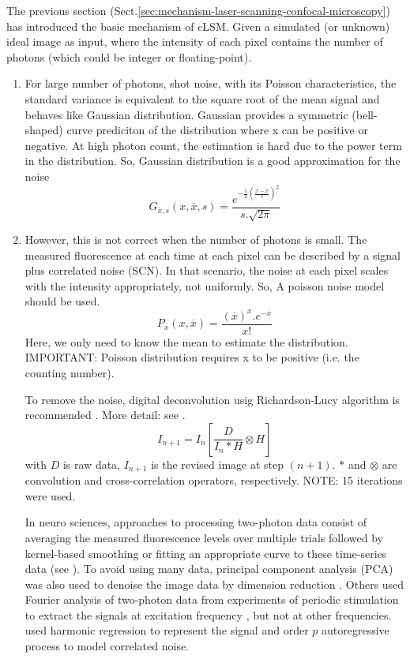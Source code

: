 The previous section (Sect.\ref{sec:mechanism-laser-scanning-confocal-microscopy}) has introduced the basic
mechanism of cLSM.  Given a simulated (or unknown) ideal image as input, where
the intensity of each pixel contains the number of photons (which could be
integer or floating-point).
\begin{enumerate}
  \item  For large number of photons, shot noise, with its Poisson
  characteristics, the standard variance is equivalent to the square root of the
  mean signal and behaves like Gaussian distribution.  Gaussian provides a
  symmetric (bell-shaped) curve prediciton of the distribution where x can be
  positive or negative. At high photon count, the estimation is  hard due to the
  power term in the distribution. So, Gaussian distribution is a  good
  approximation for the noise 
\begin{equation}
G_{\overline{x},s}(x,\overline{x},s) =
\frac{e^{-\frac{1}{2}(\frac{x-\overline{x}}{s})^2}}{s.\sqrt{2\pi}}
\end{equation}
 
  \item However, this is not correct when the number of photons is small.
  The measured fluorescence at each time at each pixel can be described by a
  signal plus correlated noise (SCN). In that scenario, the noise at each pixel
  scales with the intensity appropriately, not uniformly. So, A poisson noise
  model should be used.
  \begin{equation}
P_{\overline{x}}(x,\overline{x}) = \frac{(\overline{x})^x.e^{-\overline{x}}}{x!}
\end{equation}
Here, we only need to know the mean to estimate the distribution. IMPORTANT:
Poisson distribution requires x to be positive (i.e. the counting number).

  To remove the noise, digital deconvolution usig Richardson-Lucy algorithm is
  recommended \citep{richardson1972, vanderVoort1995, vankempen1997}. More
  detail: see \citep{soeller1999}.
  \begin{equation}
  I_{n+1}=I_n\left[ \frac{D}{I_n*H} \otimes H \right]
  \end{equation}
  with $D$ is raw data, $I_{n+1}$ is the revised image at step $(n+1)$. $*$ and
  $\otimes$ are convolution and cross-correlation operators, respectively. NOTE:
  15 iterations were used.
  
  In neuro sciences, approaches to processing two-photon data consist of
  averaging the measured fluorescence levels over multiple trials followed by
  kernel-based smoothing or fitting an appropriate curve to these time-series
  data (see \citep{malik2011}). To avoid using many data, principal component
  analysis (PCA) was also used to denoise the image data by dimension reduction
  \citep{mukamel2009}. Others used Fourier analysis of two-photon data from
  experiments of periodic stimulation to extract the signals at excitation
  frequency \citep{kalatsky2003, mrsic-flogel2003}, but not at other
  frequencies. \citep{malik2011} used harmonic regression to represent the
  signal and order $p$ autoregressive process to model correlated noise.
\end{enumerate}


